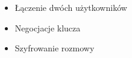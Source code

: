 \begin{itemize}
\item Łączenie dwóch użytkowników
\item Negocjacje klucza
\item Szyfrowanie rozmowy
\end{itemize}
